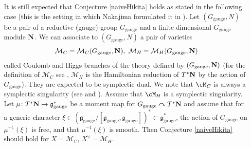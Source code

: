 \documentclass[12pt]{amsart}
\begin{document}
    \begin{rmk}\label{rem_when_expect_hn_coulomb}
    It is still expected that Conjecture \ref{naiveHikita} holds as stated in the following case (this is the setting in which Nakajima formulated it in \cite[Section 1(viii)]{nakajima_coulombI}). Let $(G_{\mathrm{gauge}},N)$ be a pair of a reductive (gauge) group $G_{\mathrm{gauge}}$ and a finite-dimensional $G_{\mathrm{gauge}}$-module ${\bf{N}}$. We can associate to $(G_{\mathrm{gauge}},N)$ a pair of varieties 
    \begin{equation*}
    \mathcal{M}_C=\mathcal{M}_{C}(G_{\mathrm{gauge}},{\bf{N}}),~\mathcal{M}_H=\mathcal{M}_{H}(G_{\mathrm{gauge}},{\bf{N}})
    \end{equation*}
    called Coulomb and Higgs branches of the theory defined by $(G_{\mathrm{gauge}},{\bf{N}})$ (for the definition of $\mathcal{M}_C$ see \cite[Section 3]{BFNII}, $\mathcal{M}_H$ is the Hamiltonian reduction of $T^*{\bf{N}}$ by the action of $G_{\mathrm{gauge}}$). They are expected to be symplectic dual. We note that $\cM_C$ is always a symplectic singularity (see \cite{bellamy} and \cite{weekes_sympl_sing}). Assume that $\cM_H$ is a symplectic singularity.
    Let $\mu\colon T^*{\bf{N}} \rightarrow \mathfrak{g}_{\mathrm{gauge}}^*$ be a moment map for $G_{\mathrm{gauge}} \curvearrowright T^*{\bf{N}}$ and assume that for a generic character $\xi \in (\mathfrak{g}_{\mathrm{gauge}}/[\mathfrak{g}_{\mathrm{gauge}},\mathfrak{g}_{\mathrm{gauge}}])^* \subset \mathfrak{g}^*_{\mathrm{gauge}}$, the action of $G_{\mathrm{gauge}}$ on $\mu^{-1}(\xi)$ is free, and that $\mu^{-1}(\xi)$ is smooth. Then  Conjecture \ref{naiveHikita} should hold for $X=\mathcal{M}_{C}$, $X^\vee=\mathcal{M}_{H}$. %
    \end{rmk}
\end{document}

